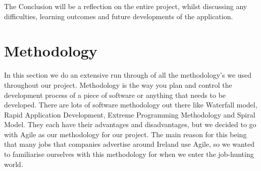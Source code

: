 The Conclusion will be a reflection on the entire project, whilst discussing any difficulties, learning outcomes and future developments of the application.

\chapter{Methodology}
In this section we do an extensive run through of all the methodology’s we used throughout our project. Methodology is the way you plan and control the development process of a piece of software or anything that needs to be developed. There are lots of software methodology out there like Waterfall model, Rapid Application Development, Extreme Programming Methodology and Spiral Model. They each have their advantages and disadvantages, but we decided to go with Agile as our methodology for our project. The main reason for this being that many jobs that companies advertise around Ireland use Agile, so we wanted to familiarise ourselves with this methodology for when we enter the job-hunting world.

